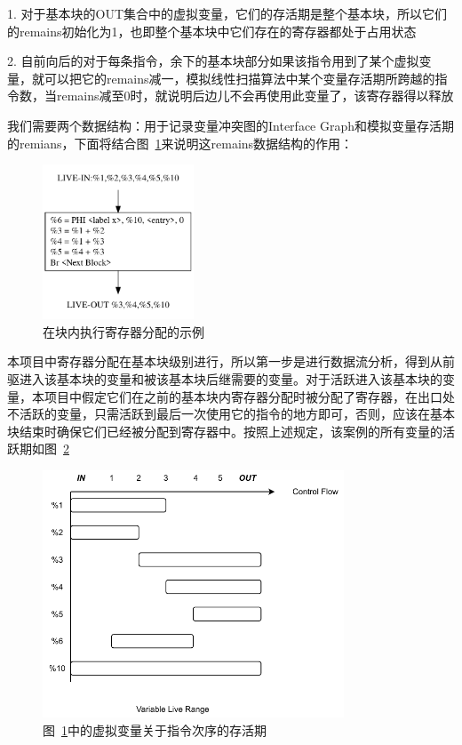 1. 对于基本块的OUT集合中的虚拟变量，它们的存活期是整个基本块，所以它们的remains初始化为1，也即整个基本块中它们存在的寄存器都处于占用状态

2. 自前向后的对于每条指令，余下的基本块部分如果该指令用到了某个虚拟变量，就可以把它的remains减一，模拟线性扫描算法中某个变量存活期所跨越的指令数，当remains减至0时，就说明后边儿不会再使用此变量了，该寄存器得以释放

我们需要两个数据结构：用于记录变量冲突图的Interface Graph和模拟变量存活期的remians，下面将结合图~\ref{fig:regAlloc}来说明这remains数据结构的作用：

\begin{figure}[htb]
  \centering
  \includegraphics[width=0.4\textwidth]{figures/reg_alloc.pdf}
  \caption{在块内执行寄存器分配的示例}
  \label{fig:regAlloc}
\end{figure}


本项目中寄存器分配在基本块级别进行，所以第一步是进行数据流分析，得到从前驱进入该基本块的变量和被该基本块后继需要的变量。对于活跃进入该基本块的变量，本项目中假定它们在之前的基本块内寄存器分配时被分配了寄存器，在出口处不活跃的变量，只需活跃到最后一次使用它的指令的地方即可，否则，应该在基本块结束时确保它们已经被分配到寄存器中。按照上述规定，该案例的所有变量的活跃期如图~\ref{fig:regAllocLiveRange}

\begin{figure}[htb]
  \centering
  \includegraphics[width=0.8\textwidth]{figures/reg_live_range.pdf}
  \caption{图~\ref{fig:regAlloc}中的虚拟变量关于指令次序的存活期}
  \label{fig:regAllocLiveRange}
\end{figure}


